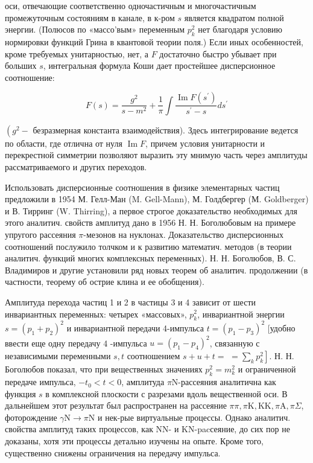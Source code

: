\documentclass[10pt]{article}
\begin{document}
оси, отвечающие соответственно одночастичным и многочастичным промежуточным состояниям в канале, в к-ром $s$ является квадратом полной энергии. (Полюсов по «массо'вым» переменным $p_{k}^{2}$ нет благодаря условию нормировки функций Грина в квантовой теории поля.) Если иных особенностей, кроме требуемых унитарностью, нет, а $F$ достаточно быстро убывает при больших $s$, интегральная формула Коши дает простейшее дисперсионное соотношение:



\[

F(s)=\frac{g^{2}}{s-m^{2}}+\frac{1}{\pi} \int \frac{\operatorname{Im} F\left(s^{\prime}\right)}{s^{\prime}-s} d s^{\prime}

\]



$\left(g^{2}-\right.$ безразмерная константа взаимодействия). Здесь интегрирование ведется по области, где отлична от нуля $\operatorname{Im} F$, причем условия унитарности и перекрестной симметрии позволяют выразить эту мнимую часть через амплитуды рассматриваемого и других переходов.



Использовать дисперсионные соотношения в физике элементарных частиц предложили в 1954 М. Гелл-Ман (M. Gell-Mann), М. Голдбергер (М. Goldberger) и В. Тирринг (W. Thirring), а первое строгое доказательство необходимых для этого аналитич. свойств амплитуд дано в 1956 Н. Н. Боголюбовым на примере упругого рассеяния $\pi$-мезонов на нуклонах. Доказательство дисперсионных соотношений послужило толчком и к развитию математич. методов (в теории аналитич. функций многих комплексных переменных). Н. Н. Боголюбов, В. С. Владимиров и другие установили ряд новых теорем об аналитич. продолжении (в частности, теорему об острие клина и ее обобщения).



Амплитуда перехода частиц 1 и 2 в частицы 3 и 4 зависит от шести инвариантных переменных: четырех «массовых», $p_{k}^{2}$, инвариантной энергии $s=\left(p_{1}+p_{2}\right)^{2}$ и инвариантной передачи 4-импульса $t=\left(p_{1}-p_{3}\right)^{2}$ [удобно ввести еще одну передачу 4 -импульса $u=\left(p_{1}-p_{4}\right)^{2}$, связанную с независимыми переменными $s, t$ соотношением $s+u+t=$ $\left.=\sum_{k} p_{k}^{2}\right]$. Н. Н. Боголюбов показал, что при вещественных значениях $p_{k}^{2}=m_{k}^{2}$ и ограниченной передаче импульса, $-t_{0}<t<0$, амплитуда $\pi \mathrm{N}$-рассеяния аналитична как функция $s$ в комплексной плоскости с разрезами вдоль вещественной оси. В дальнейшем этот результат был распространен на рассеяние $\pi \pi, \pi \mathrm{K}, \mathrm{KK}, \pi \mathrm{A}, \pi \Sigma$, фоторождение $\gamma \mathrm{N} \rightarrow \pi \mathrm{N}$ и нек-рые виртуальные процессы. Однако аналитич. свойства амплитуд таких процессов, как NN- и KN-pacсеяние, до сих пор не доказаны, хотя эти процессы детально изучены на опыте. Кроме того, существенно снижены ограничения на передачу импульса.
\end{document}
